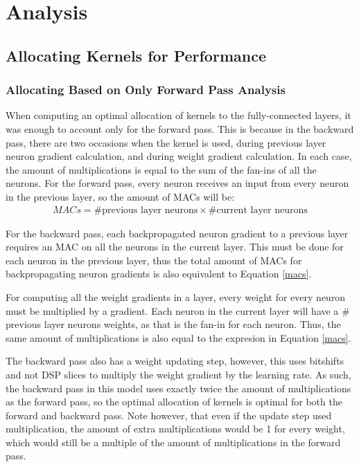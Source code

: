 \chapter{Analysis}\label{analysis}

\section{Allocating Kernels for Performance}
\subsection{Allocating Based on Only Forward Pass Analysis}
When computing an optimal allocation of kernels to the fully-connected layers, it was enough to account only for the forward pass. This is because in the backward pass, there are two occasions when the kernel is used, during previous layer neuron gradient calculation, and during weight gradient calculation. In each case, the amount of multiplications is equal to the sum of the fan-ins of all the neurons. For the forward pass, every neuron receives an input from every neuron in the previous layer, so the amount of MACs will be:
\begin{align}
MACs = \text{\#previous layer neurons} \times \text{\#current layer neurons} \label{macs}
\end{align}

For the backward pass, each backpropagated neuron gradient to a previous layer requires an MAC on all the neurons in the current layer. This must be done for each neuron in the previous layer, thus the total amount of MACs for backpropagating neuron gradients is also equivalent to Equation \ref{macs}.

For computing all the weight gradients in a layer, every weight for every neuron must be multiplied by a gradient. Each neuron in the current layer will have a \# previous layer neurons weights, as that is the fan-in for each neuron. Thus, the same amount of multiplications is also equal to the expresion in Equation \ref{macs}.

The backward pass also has a weight updating step, however, this uses bitshifts and not DSP slices to multiply the weight gradient by the learning rate. As such, the backward pass in this model uses exactly twice the amount of multiplications as the forward pass, so the optimal allocation of kernels is optimal for both the forward and backward pass. Note however, that even if the update step used multiplication, the amount of extra multiplications would be 1 for every weight, which would still be a multiple of the amount of multiplications in the forward pass.

